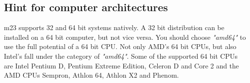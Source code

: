 \subsection{Hint for computer architectures}
m23 supports 32 and 64 bit systems natively. A 32 bit distribution can be installed on a 64 bit computer, but not vice versa. You should choose \textit{"amd64"} to use the full potential of a 64 bit CPU. Not only AMD's 64 bit CPUs, but also Intel's fall under the category of \textit{"amd64"}. Some of the supported 64 bit CPUs are Intel Pentium D, Pentium Extreme Edition, Celeron D and Core 2 and the AMD CPUs Sempron, Athlon 64, Athlon X2 and Phenom.\\
